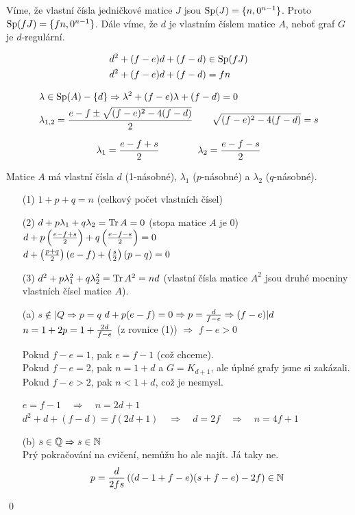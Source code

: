 Víme, že vlastní čísla jedničkové matice $J$ jsou $\operatorname{Sp}(J) = \{n, 0^{n-1}\}$.
Proto $\operatorname{Sp}(fJ) = \{fn, 0^{n-1}\}$. Dále víme, že $d$ je vlastním číslem matice
$A$, neboť graf $G$ je $d$-regulární.

\begin{align}
	&d^2 + (f-e)d + (f-d) \in \operatorname{Sp}(fJ) \\
	&d^2 + (f-e)d + (f-d) = fn
\end{align}

\begin{align}
	&\lambda \in \operatorname{Sp}(A) - \{d\} \Rightarrow \lambda^2 + (f-e)\lambda + (f-d) = 0 \\
	&\lambda_{1,2} = {e-f \pm \sqrt{(f-e)^2-4(f-d)} \over 2} \qquad \sqrt{(f-e)^2-4(f-d)} = s
\end{align}

$$\lambda_1 = {e-f+s\over 2}\qquad\qquad \lambda_2 = {e-f-s\over 2}$$

Matice $A$ má vlastní čísla $d$ (1-násobné), $\lambda_1$ ($p$-násobné) a
$\lambda_2$ ($q$-násobné).

\begin{enumerate}
	\item[(1)] $1 + p + q = n$ (celkový počet vlastních čísel)

	\item[(2)] $d + p\lambda_1 + q\lambda_2 = \operatorname{Tr} A = 0$ (stopa matice $A$ je 0) \\
	$d + p\left({e-f+s\over 2}\right) + q\left({e-f-s\over 2}\right) = 0$ \\
	$d + \left({p+q\over 2}\right)(e-f) + \left({s\over 2}\right)(p-q) = 0$

	\item[(3)] $d^2 + p\lambda_1^2 + q\lambda_2^2 = \operatorname{Tr} A^2 = nd$ (vlastní čísla matice $A^2$ jsou druhé mocniny vlastních čísel matice $A$).
\end{enumerate}

\begin{enumerate}
	\item[(a)] $s\not\in |Q \Rightarrow p = q$ \quad $d + p(e-f) = 0 \Rightarrow p = {d\over f-e} \Rightarrow (f-e)|d$ \\
	$n = 1 + 2p = 1 + {2d\over f-e}$ \quad (z rovnice (1)) $\Rightarrow$ $f-e > 0$

	Pokud $f-e = 1$, pak $e = f-1$ (což chceme). \\
	Pokud $f-e = 2$, pak $n = 1+d$ a $G = K_{d+1}$, ale úplné grafy jsme si zakázali. \\
	Pokud $f-e > 2$, pak $n < 1+d$, což je nesmysl.

	$e = f-1 \quad\Rightarrow\quad n = 2d+1$ \\
	$d^2 + d + (f-d) = f(2d+1) \quad\Rightarrow\quad d = 2f \quad\Rightarrow\quad n = 4f+1$

	\item[(b)] $s\in\mathbb{Q}\Rightarrow s\in\mathbb{N}$ \\
	\todo Prý pokračování na cvičení, nemůžu ho ale najít. Já taky ne. \\
	$$p = {d\over 2fs}\left((d-1+f-e)(s+f-e)-2f\right) \in \mathbb{N}$$
\end{enumerate}
\qed



